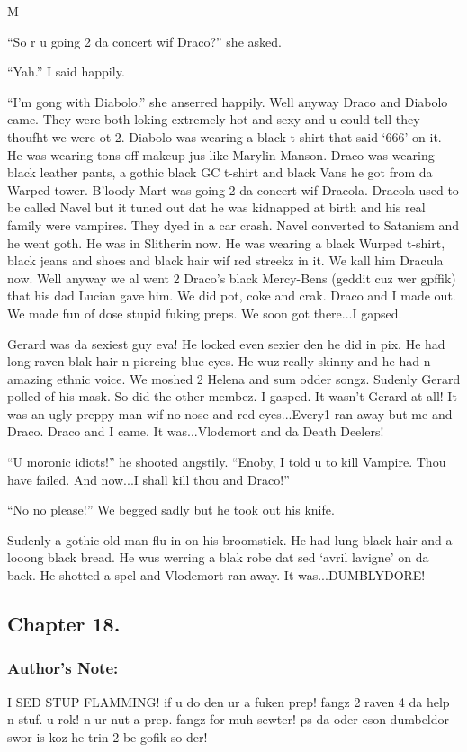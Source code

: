 M\documentclass{article}
\begin{document}
“So r u going 2 da concert wif Draco?” she asked.

“Yah.” I said happily.

“I’m gong with Diabolo.” she anserred happily. Well anyway Draco and Diabolo came. They were both loking extremely hot and sexy and u could tell they thoufht we were ot 2. Diabolo was wearing a black t-shirt that said ‘666’ on it. He was wearing tons off makeup jus like Marylin Manson. Draco was wearing black leather pants, a gothic black GC t-shirt and black Vans he got from da Warped tower. B’loody Mart was going 2 da concert wif Dracola. Dracola used to be called Navel but it tuned out dat he was kidnapped at birth and his real family were vampires. They dyed in a car crash. Navel converted to Satanism and he went goth. He was in Slitherin now. He was wearing a black Wurped t-shirt, black jeans and shoes and black hair wif red streekz in it. We kall him Dracula now. Well anyway we al went 2 Draco’s black Mercy-Bens (geddit cuz wer gpffik) that his dad Lucian gave him. We did pot, coke and crak. Draco and I made out. We made fun of dose stupid fuking preps. We soon got there...I gapsed.

Gerard was da sexiest guy eva! He locked even sexier den he did in pix. He had long raven blak hair n piercing blue eyes. He wuz really skinny and he had n amazing ethnic voice. We moshed 2 Helena and sum odder songz. Sudenly Gerard polled of his mask. So did the other membez. I gasped. It wasn’t Gerard at all! It was an ugly preppy man wif no nose and red eyes...Every1 ran away but me and Draco. Draco and I came. It was...Vlodemort and da Death Deelers!

“U moronic idiots!” he shooted angstily. “Enoby, I told u to kill Vampire. Thou have failed. And now...I shall kill thou and Draco!”

“No no please!” We begged sadly but he took out his knife.

Sudenly a gothic old man flu in on his broomstick. He had lung black hair and a looong black bread. He wus werring a blak robe dat sed ‘avril lavigne’ on da back. He shotted a spel and Vlodemort ran away. It was...DUMBLYDORE!

\clearpage\nolinenumbers
\subsection*{Chapter 18.}

\subsubsection*{Author's Note: }I SED STUP FLAMMING! if u do den ur a fuken prep! fangz 2 raven 4 da help n stuf. u rok! n ur nut a prep. fangz for muh sewter! ps da oder eson dumbeldor swor is koz he trin 2 be gofik so der!
\end{document}
